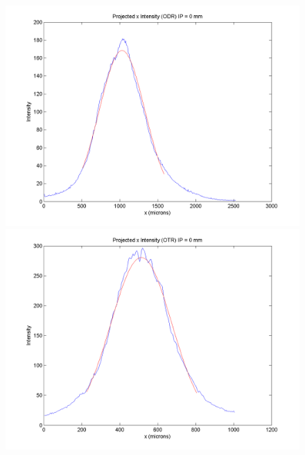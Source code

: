 \documentclass[12pt]{article}
\begin{document}
\begin{figure}
\begin{center}
\includegraphics[scale=0.5]{Figures/ProjX_ODR_0.PNG}
\includegraphics[scale=0.5]{Figures/ProjX_OTR_0.PNG}
\caption{}
\end{center}
\end{figure}
\end{document}
